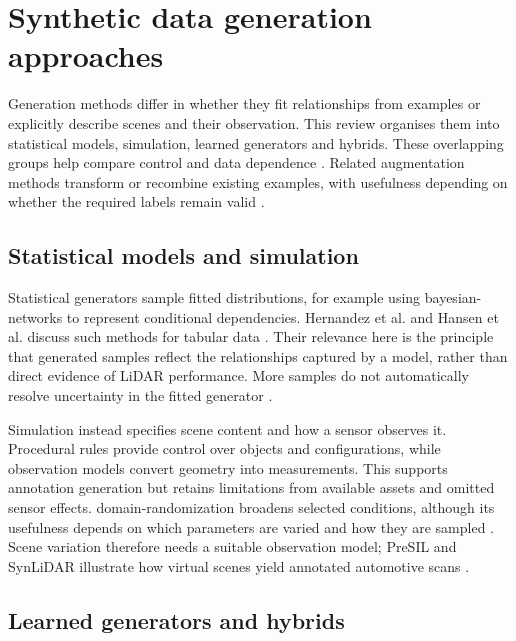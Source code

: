 \section{Synthetic data generation approaches}
\label{sec:rq1}

Generation methods differ in whether they fit relationships from examples
or explicitly describe scenes and their observation. This review organises
them into statistical models, simulation, learned generators and hybrids.
These overlapping groups help compare control and data dependence
\parencite{hernandezSyntheticDataGeneration2022,nikolenkoSyntheticDataDeep2019}.
Related \gls{augmentation} methods transform or recombine existing examples,
with usefulness depending on whether the required labels remain valid
\parencite{nikolenkoSyntheticDataDeep2019}.

\subsection{Statistical models and simulation}

Statistical generators sample fitted distributions, for example using
\glspl{bayesian-network} to represent conditional dependencies.
Hernandez et al. and Hansen et al. discuss such methods for tabular data
\parencite{hernandezSyntheticDataGeneration2022,hansenReimaginingSyntheticTabular2023}.
Their relevance here is the principle that generated samples reflect the
relationships captured by a model, rather than direct evidence of LiDAR
performance. More samples do not automatically resolve uncertainty in the
fitted generator \parencite{breugelSyntheticDataReal2023}.

Simulation instead specifies scene content and how a sensor observes it.
Procedural rules provide control over objects and configurations, while
observation models convert geometry into measurements. This supports
annotation generation but retains limitations from available assets and
omitted sensor effects. \Gls{domain-randomization} broadens selected
conditions, although its usefulness depends on which parameters are varied
and how they are sampled \parencite{nikolenkoSyntheticDataDeep2019}.
Scene variation therefore needs a suitable observation model; PreSIL and
SynLiDAR illustrate how virtual scenes yield annotated automotive scans
\parencite{hurlPreciseSyntheticImage2019,xiaoTransferLearningSynthetic2022}.

\subsection{Learned generators and hybrids}

